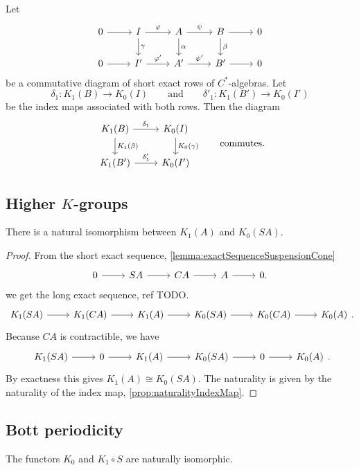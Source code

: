 \begin{proposition} \label{prop:naturalityIndexMap}
Let
\[ \begin{tikzcd}
0 \rar & I \dar{\gamma} \rar{\varphi} & A \dar{\alpha} \rar{\psi} & B \dar{\beta} \rar & 0 \\
0 \rar & I' \rar{\varphi'} & A' \rar{\psi'} & B' \rar & 0
\end{tikzcd} \]
be a commutative diagram of short exact rows of $C^*$-algebras. Let
\[ \delta_1: K_1(B) \to K_0(I) \qquad \text{and} \qquad \delta'_1: K_1(B') \to K_0(I') \]
be the index maps associated with both rows. Then the diagram
\[ \begin{tikzcd}
K_1(B) \rar{\delta_1} \dar{K_1(\beta)} & K_0(I) \dar{K_0(\gamma)} \\
K_1(B') \rar{\delta_1'} & K_0(I')
\end{tikzcd} \qquad \text{commutes.} \]
\end{proposition}

\subsection{Higher $K$-groups}
\begin{proposition}
There is a natural isomorphism between $K_1(A)$ and $K_0(SA)$.
\end{proposition}
\begin{proof}
From the short exact sequence, \ref{lemma:exactSequenceSuspensionCone}
\[ \begin{tikzcd}
 0 \rar & SA \rar & CA \rar & A \rar & 0.
\end{tikzcd} \]
we get the long exact sequence, ref TODO.
\[ \begin{tikzcd}
K_1(SA) \rar & K_1(CA) \rar & K_1(A) \rar & K_0(SA) \rar & K_0(CA) \rar & K_0(A)
\end{tikzcd}. \]
Because $CA$ is contractible, we have
\[ \begin{tikzcd}
K_1(SA) \rar & 0 \rar & K_1(A) \rar & K_0(SA) \rar & 0 \rar & K_0(A)
\end{tikzcd}. \]
By exactness this gives $K_1(A) \cong K_0(SA)$. The naturality is given by the naturality of the index map, \ref{prop:naturalityIndexMap}.
\end{proof}

\subsection{Bott periodicity}
\begin{theorem}
The functors $K_0$ and $K_1\circ S$ are naturally isomorphic.
\end{theorem}
